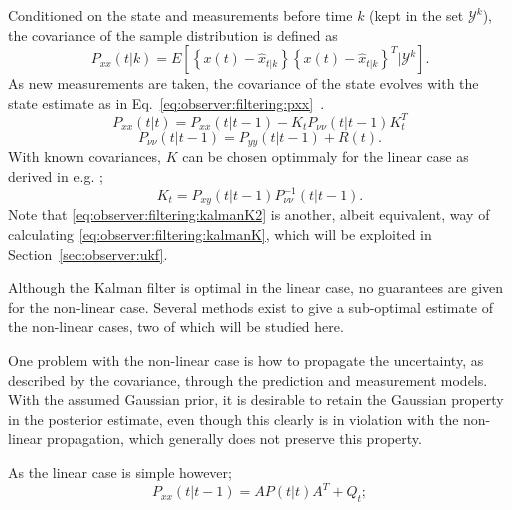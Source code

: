     Conditioned on the state and measurements before time $k$ (kept in the set $\mathcal{Y}^{k}$), the
    covariance of the sample distribution is defined as
    \begin{equation}
        P_{xx}(t|k) = E \left[ \left\lbrace x(t) - \hat{x}_{t|k} \right\rbrace
                               \left\lbrace x(t) - \hat{x}_{t|k} \right\rbrace^{T}
                               | \mathcal{Y}^{k} \right] .
    \end{equation}
    As new measurements are taken, the covariance of the state evolves
    with the state estimate as in Eq.~\eqref{eq:observer:filtering:pxx}~\citep{Julier95anewapproach}.
    \begin{equation}
        \label{eq:observer:filtering:pxx}
        P_{xx}(t|t) = P_{xx}(t|t-1) - K_{t}P_{\nu\nu}(t|t-1)K_{t}^{T}
    \end{equation}
    \begin{equation}
        \label{eq:observer:filtering:pnunu}
        P_{\nu\nu}(t|t-1) = P_{yy}(t|t-1) + R(t) .
    \end{equation}
    With known covariances, $K$ can be chosen optimmaly for the linear case as derived in e.g. \citep{gustafsson2010statistical};
    \begin{equation}
        \label{eq:observer:filtering:kalmanK2}
        K_{t} = P_{xy}(t|t-1)P_{\nu\nu}^{-1}(t|t-1).
    \end{equation}
    Note that \eqref{eq:observer:filtering:kalmanK2} is another, albeit equivalent,
    way of calculating \eqref{eq:observer:filtering:kalmanK}, which will be exploited
    in Section~\ref{sec:observer:ukf}.

    Although the Kalman filter is optimal in the linear case, no guarantees are given for the non-linear case.
    Several methods exist to give a sub-optimal estimate of the non-linear cases,
    two of which will be studied here.

    One problem with the non-linear case is how to propagate the uncertainty,
    as described by the covariance, through the prediction and measurement models.
    With the assumed Gaussian prior, it is desirable to retain the Gaussian
    property in the posterior estimate, even though this clearly is in violation with the
    non-linear propagation, which generally does not preserve this property.

    As the linear case is simple however;
    \begin{equation}
        P_{xx}(t|t-1) = AP(t|t)A^{T} + Q_{t};
    \end{equation}

